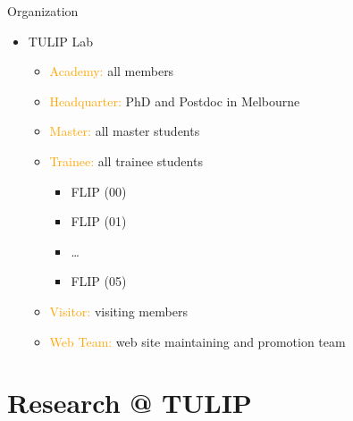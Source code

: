 \documentclass[
 size=14pt,
 paper=smartboard,  %
 mode=present, 		%
 display=slides, 	%
 style=tuliplab,  	%
 pauseslide,
 fleqn,leqno]{powerdot}
\begin{document}
\begin{slide}{Organization}
\begin{itemize}
  \item TULIP Lab
  \begin{itemize}
    \item \textcolor{orange}{Academy:} all members
    \item \textcolor{orange}{Headquarter:} PhD and Postdoc in Melbourne
    \item \textcolor{orange}{Master:} all master students
    \item \textcolor{orange}{Trainee:} all trainee students
        \begin{itemize}
          \item FLIP (00)
          \item FLIP (01)
          \item \dots
          \item FLIP (05)
        \end{itemize}
    \item \textcolor{orange}{Visitor:} visiting members
    \item \textcolor{orange}{Web Team:} web site maintaining and promotion team
  \end{itemize}
\end{itemize}

\end{slide}


\section{Research @ TULIP}
\end{document}
